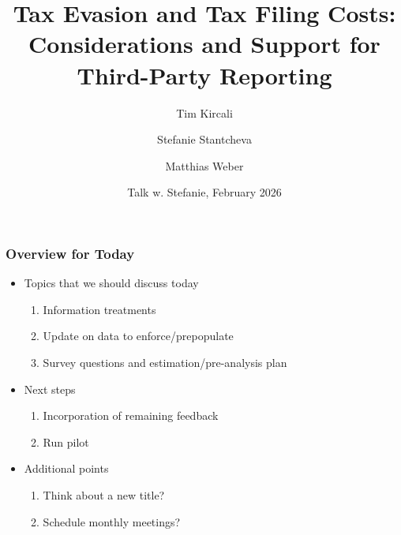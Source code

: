 \documentclass{beamer}
\title[Tax Evasion and Tax Filing Costs]{Tax Evasion and Tax Filing Costs: \\
Considerations and Support for Third-Party Reporting} %
\author[Kircali, Stantcheva and Weber] %
{Tim Kircali\inst{1} \and Stefanie Stantcheva\inst{2} \and Matthias Weber\inst{1}}
\institute[] %
{
\inst{1} University of St.Gallen \\
\inst{2} Harvard University
}
{
\medskip

}
\date[February 2026]{Talk w. Stefanie, February 2026}
\begin{document}
\begin{frame}
\titlepage %
\end{frame}

\begin{frame}
\frametitle{Overview for Today}
\begin{itemize}
    \item Topics that we should discuss today\vspace{0.5em}
    \begin{enumerate}
        \item Information treatments \vspace{0.5em}
        \item Update on data to enforce/prepopulate \vspace{0.5em}
        \item Survey questions and estimation/pre-analysis plan\vspace{1.5em}
    \end{enumerate}
    \item Next steps \vspace{0.5em}
    \begin{enumerate}
        \item Incorporation of remaining feedback \vspace{0.5em}
        \item Run pilot \vspace{1.5em}
    \end{enumerate}
    \item Additional points \vspace{0.5em}
    \begin{enumerate}
        \item Think about a new title? \vspace{0.5em}
        \item Schedule monthly meetings? \vspace{0.5em}
    \end{enumerate}
\end{itemize}
\end{frame}
\end{document}
